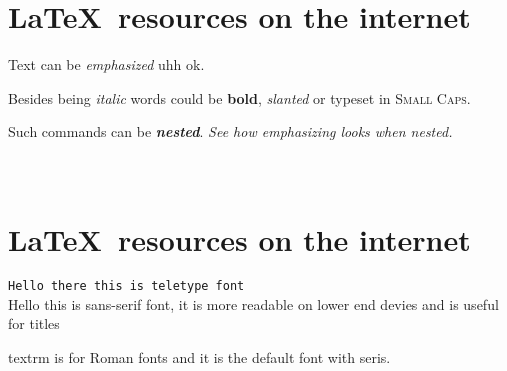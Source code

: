 \documentclass{article}
\begin{document}
\section{\textsf{\LaTeX\ resources on the internet}}


Text can be \emph{emphasized} uhh ok.

Besides being \textit{italic} words could be \textbf{bold},
\textsl{slanted} or typeset in \textsc{Small Caps}.

Such commands can be \textit{\textbf{nested}}.
\emph{See how \emph{emphasizing} looks when nested.}
\\\\\\

\section{\LaTeX\ resources on the internet}
\texttt{Hello there this is teletype font}
\\
\textsf{Hello this is sans-serif font, it is more readable on lower end devies and is useful for titles}

\textrm textrm is for Roman fonts and it is the default font with seris. 
\end{document}
